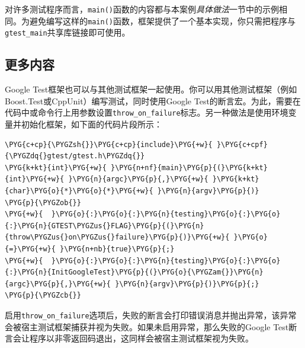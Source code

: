 
对许多测试程序而言，\texttt{main()}函数的内容都与本案例\textit{具体做法}一节中的示例相同。为避免编写这样的\texttt{main()}函数，框架提供了一个基本实现，你只需把程序与\texttt{gtest\_\allowbreak{}main}共享库链接即可使用。



\subsection{更多内容}



Google Test框架也可以与其他测试框架一起使用。你可以用其他测试框架（例如Boost.Test或CppUnit）编写测试，同时使用Google Test的断言宏。为此，需要在代码中或命令行上用参数设置\texttt{throw\_\allowbreak{}on\_\allowbreak{}failure}标志。另一种做法是使用环境变量并初始化框架，如下面的代码片段所示：



\begin{codeblockbg}
\begin{Verbatim}[commandchars=\\\{\},breaklines=true,breakanywhere=true,fontsize=\codefont,xleftmargin=17bp]
\PYG{c+cp}{\PYGZsh{}}\PYG{c+cp}{include}\PYG{+w}{ }\PYG{c+cpf}{\PYGZdq{}gtest/gtest.h\PYGZdq{}}
\PYG{k+kt}{int}\PYG{+w}{ }\PYG{n+nf}{main}\PYG{p}{(}\PYG{k+kt}{int}\PYG{+w}{ }\PYG{n}{argc}\PYG{p}{,}\PYG{+w}{ }\PYG{k+kt}{char}\PYG{o}{*}\PYG{o}{*}\PYG{+w}{ }\PYG{n}{argv}\PYG{p}{)}
\PYG{p}{\PYGZob{}}
\PYG{+w}{  }\PYG{o}{:}\PYG{o}{:}\PYG{n}{testing}\PYG{o}{:}\PYG{o}{:}\PYG{n}{GTEST\PYGZus{}FLAG}\PYG{p}{(}\PYG{n}{throw\PYGZus{}on\PYGZus{}failure}\PYG{p}{)}\PYG{+w}{ }\PYG{o}{=}\PYG{+w}{ }\PYG{n+nb}{true}\PYG{p}{;}
\PYG{+w}{  }\PYG{o}{:}\PYG{o}{:}\PYG{n}{testing}\PYG{o}{:}\PYG{o}{:}\PYG{n}{InitGoogleTest}\PYG{p}{(}\PYG{o}{\PYGZam{}}\PYG{n}{argc}\PYG{p}{,}\PYG{+w}{ }\PYG{n}{argv}\PYG{p}{)}\PYG{p}{;}
\PYG{p}{\PYGZcb{}}
\end{Verbatim}
\end{codeblockbg}



启用\texttt{throw\_\allowbreak{}on\_\allowbreak{}failure}选项后，失败的断言会打印错误消息并抛出异常，该异常会被宿主测试框架捕获并视为失败。如果未启用异常，那么失败的Google Test断言会让程序以非零返回码退出，这同样会被宿主测试框架视为失败。


